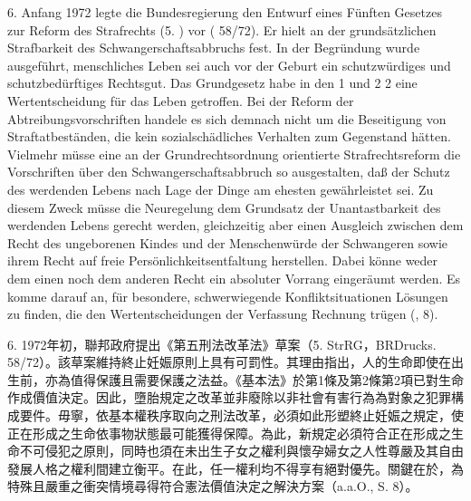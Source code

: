 \documentclass[12pt]{article}
\begin{document}
\syncleft
\begin{sourcepara}
6. Anfang 1972 legte die Bundesregierung den Entwurf eines Fünften Gesetzes zur Reform des Strafrechts (5. \abbrStrRG{}) vor (\abbrBRDrucks{} 58/72). Er hielt an der grundsätzlichen Strafbarkeit des Schwangerschaftsabbruchs fest. In der Begründung wurde ausgeführt, menschliches Leben sei auch vor der Geburt ein schutzwürdiges und schutzbedürftiges Rechtsgut. Das Grundgesetz habe in den \abbrArt{} 1 und \abbrArt{} 2 \abbrAbs{} 2\ggfnArtOneTwoTwoDE{} eine Wertentscheidung für das Leben getroffen. Bei der Reform der Abtreibungsvorschriften handele es sich demnach nicht um die Beseitigung von Straftatbeständen, die kein sozialschädliches Verhalten zum Gegenstand hätten. Vielmehr müsse eine an der Grundrechtsordnung orientierte Strafrechtsreform die Vorschriften über den Schwangerschaftsabbruch so ausgestalten, daß der Schutz des werdenden Lebens nach Lage der Dinge am ehesten gewährleistet sei. Zu diesem Zweck müsse die Neuregelung dem Grundsatz der Unantastbarkeit des werdenden Lebens gerecht werden, gleichzeitig aber einen Ausgleich zwischen dem Recht des ungeborenen Kindes und der Menschenwürde der Schwangeren sowie ihrem Recht auf freie Persönlichkeitsentfaltung herstellen. Dabei könne weder dem einen noch dem anderen Recht ein absoluter Vorrang eingeräumt werden. Es komme darauf an, für besondere, schwerwiegende Konfliktsituationen Lösungen zu finden, die den Wertentscheidungen der Verfassung Rechnung trügen (\abbrAAO{}, \abbrS{} 8).
\end{sourcepara}
\begin{transpara}
6. 1972年初，聯邦政府提出《第五刑法改革法》草案（5. StrRG，BRDrucks. 58/72）。該草案維持終止妊娠原則上具有可罰性。其理由指出，人的生命即使在出生前，亦為值得保護且需要保護之法益。《基本法》於第1條及第2條第2項\ggfnArtOneTwoTwoZH{}已對生命作成價值決定。因此，墮胎規定之改革並非廢除以非社會有害行為為對象之犯罪構成要件。毋寧，依基本權秩序取向之刑法改革，必須如此形塑終止妊娠之規定，使正在形成之生命依事物狀態最可能獲得保障。為此，新規定必須符合正在形成之生命不可侵犯之原則，同時也須在未出生子女之權利與懷孕婦女之人性尊嚴及其自由發展人格之權利間建立衡平。在此，任一權利均不得享有絕對優先。關鍵在於，為特殊且嚴重之衝突情境尋得符合憲法價值決定之解決方案（a.a.O., S. 8）。
\end{transpara}
\end{document}
